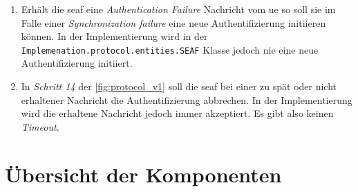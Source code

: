 \begin{enumerate}
\item Erhält die \gls{seaf} eine \textit{Authentication Failure} Nachricht vom \gls{ue} so soll sie im Falle einer \textit{Synchronization failure} eine neue Authentifizierung initiieren können.
In der Implementierung wird in der \lstinline{Implemenation.protocol.entities.SEAF} Klasse jedoch nie eine neue Authentifizierung initiiert.

\item In \textit{Schritt 14} der \cref{fig:protocol_v1} soll die \gls{seaf} bei einer zu spät oder nicht erhaltener Nachricht die Authentifizierung abbrechen.
In der Implementierung wird die erhaltene Nachricht jedoch immer akzeptiert.
Es gibt also keinen \textit{Timeout}.


\end{enumerate}


\section{Übersicht der Komponenten}
